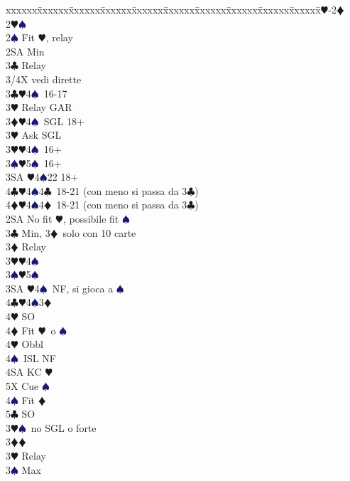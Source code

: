 \documentclass[a4paper,italian]{article}
\newcommand{\BC}{\textcolor{OliveGreen}{$\clubsuit$}}
\newcommand{\BD}{\textcolor{RedOrange}{$\vardiamondsuit$}}
\newcommand{\BH}{\textcolor{Red2}{$\varheartsuit${}}}
\newcommand{\BS}{\textcolor{MidnightBlue}{$\spadesuit${}}}
\newenvironment{bidtable}
{\begin{tabbing}

    xxxxxx\=xxxxxx\=xxxxxx\=xxxxxx\=xxxxxx\=xxxxxx\=xxxxxx\=xxxxxx\=xxxxxx\=xxxxxx\=\kill}
{\end{tabbing} }%
\begin{document}
\begin{multicols}{2}
    \begin{bidtable}
        1\BH-2\BD\\
        2\BH {}\BS \+\\
        2\BS \> Fit \BH , relay\+\\
        2SA \> Min\+\\
        3\BC \> Relay\+\\
        3/4X \> vedi dirette\-\-\\
        3\BC {}\BH 4\BS\ 16-17\+\\
        3\BH \> Relay GAR\-\\
        3\BD {}\BH 4\BS\ SGL 18+\+\\
        3\BH \> Ask SGL\-\\
        3\BH {}\BH 4\BS\ 16+\\
        3\BS {}\BH 5\BS\ 16+\\
        3SA \BH 4\BS 22 18+\\
        4\BC {}\BH 4\BS 4\BC\ 18-21 (con meno si passa da 3\BC )\\
        4\BD {}\BH 4\BS 4\BD\ 18-21 (con meno si passa da 3\BC )\-\\
        2SA \> No fit \BH , possibile fit \BS \+\\
        3\BC \> Min, 3\BD\ solo con 10 carte\+\\
        3\BD \> Relay\+\\
        3\BH {}\BH 4\BS \\
        3\BS {}\BH 5\BS \\
        3SA \BH 4\BS\ NF, si gioca a \BS \\
        4\BC {}\BH 4\BS 3\BD \+\\
        4\BH \> SO\\
        4\BD \> Fit \BH\ o \BS \+\\
        4\BH \> Obbl\+\\
        4\BS\ ISL NF\\
        4SA KC \BH \\
        5X Cue \BS \-\-\\
        4\BS \> Fit \BD \\
        5\BC \> SO\-\-\\
        3\BH {}\BS\ no SGL o forte\-\\
        3\BD {}\BD \+\\
        3\BH \> Relay\+\\
        3\BS \> Max\+\\

\end{bidtable}
\end{multicols}
\end{document}
